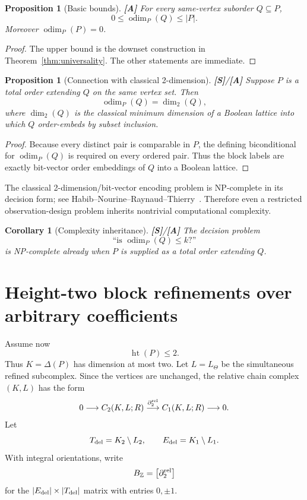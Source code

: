 \documentclass[11pt]{article}
\newtheorem{proposition}[theorem]{Proposition}
\newtheorem{corollary}[theorem]{Corollary}
\theoremstyle{definition}
\newcommand{\odim}{\operatorname{odim}}
\newcommand{\statusS}{\textbf{[S]}}
\newcommand{\statusA}{\textbf{[A]}}
\begin{document}
\begin{proposition}[Basic bounds]
\statusA\;
For every same-vertex suborder $Q\subseteq P$,
\[
0\le\odim_P(Q)\le |P|.
\]
Moreover $\odim_P(P)=0$.
\end{proposition}

\begin{proof}
The upper bound is the downset construction in Theorem~\ref{thm:universality}. The other statements are immediate.
\end{proof}

\begin{proposition}[Connection with classical 2-dimension]\label{prop:2dim}
\statusS/\statusA\;
Suppose $P$ is a total order extending $Q$ on the same vertex set. Then
\[
\odim_P(Q)=\dim_2(Q),
\]
where $\dim_2(Q)$ is the classical minimum dimension of a Boolean lattice into which $Q$ order-embeds by subset inclusion.
\end{proposition}

\begin{proof}
Because every distinct pair is comparable in $P$, the defining biconditional for $\odim_P(Q)$ is required on every ordered pair. Thus the block labels are exactly bit-vector order embeddings of $Q$ into a Boolean lattice.
\end{proof}

The classical 2-dimension/bit-vector encoding problem is NP-complete in its decision form; see Habib--Nourine--Raynaud--Thierry~\cite{Habib2004}. Therefore even a restricted observation-design problem inherits nontrivial computational complexity.

\begin{corollary}[Complexity inheritance]
\statusS/\statusA\;
The decision problem
\[
\text{``is }\odim_P(Q)\le k\text{?''}
\]
is NP-complete already when $P$ is supplied as a total order extending $Q$.
\end{corollary}

\section{Height-two block refinements over arbitrary coefficients}

Assume now
\[
\operatorname{ht}(P)\le2.
\]
Thus $K=\Delta(P)$ has dimension at most two. Let $L=L_\Theta$ be the simultaneous refined subcomplex. Since the vertices are unchanged, the relative chain complex $(K,L)$ has the form
\[
0\longrightarrow C_2(K,L;R)
\overset{\partial_2^{\rm rel}}{\longrightarrow}
C_1(K,L;R)
\longrightarrow0.
\]
Let
\[
T_{\rm del}=K_2\setminus L_2,
\qquad
E_{\rm del}=K_1\setminus L_1.
\]
With integral orientations, write
\[
B_{\mathbb Z}=\bigl[\partial_2^{\rm rel}\bigr]
\]
for the $|E_{\rm del}|\times|T_{\rm del}|$ matrix with entries $0,\pm1$.
\end{document}
